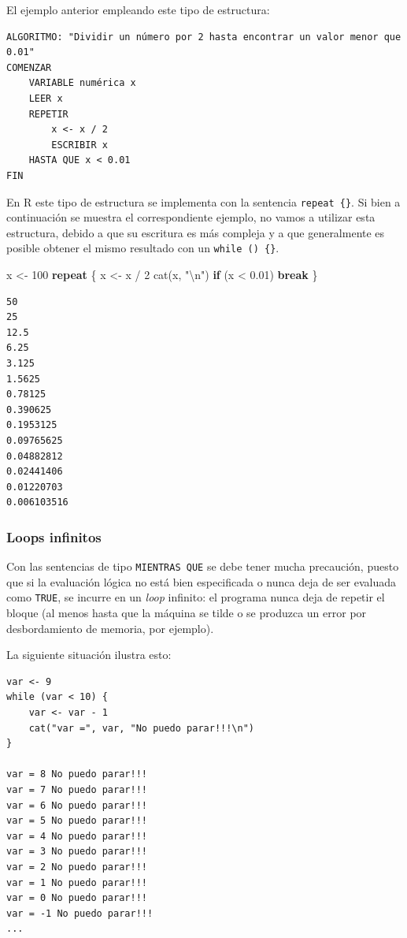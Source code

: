 \documentclass[
]{book}
\newenvironment{Shaded}{\begin{snugshade}}{\end{snugshade}}
\newcommand{\ControlFlowTok}[1]{\textcolor[rgb]{0.13,0.29,0.53}{\textbf{#1}}}
\newcommand{\DecValTok}[1]{\textcolor[rgb]{0.00,0.00,0.81}{#1}}
\newcommand{\FloatTok}[1]{\textcolor[rgb]{0.00,0.00,0.81}{#1}}
\newcommand{\FunctionTok}[1]{\textcolor[rgb]{0.00,0.00,0.00}{#1}}
\newcommand{\NormalTok}[1]{#1}
\newcommand{\OtherTok}[1]{\textcolor[rgb]{0.56,0.35,0.01}{#1}}
\newcommand{\SpecialCharTok}[1]{\textcolor[rgb]{0.00,0.00,0.00}{#1}}
\newcommand{\StringTok}[1]{\textcolor[rgb]{0.31,0.60,0.02}{#1}}
\begin{document}
El ejemplo anterior empleando este tipo de estructura:

\begin{verbatim}
ALGORITMO: "Dividir un número por 2 hasta encontrar un valor menor que 0.01"
COMENZAR
    VARIABLE numérica x
    LEER x
    REPETIR
        x <- x / 2
        ESCRIBIR x
    HASTA QUE x < 0.01
FIN
\end{verbatim}

En R este tipo de estructura se implementa con la sentencia \texttt{repeat\ \{\}}. Si bien a continuación se muestra el correspondiente ejemplo, no vamos a utilizar esta estructura, debido a que su escritura es más compleja y a que generalmente es posible obtener el mismo resultado con un \texttt{while\ ()\ \{\}}.

\begin{Shaded}
\begin{Highlighting}[]
\NormalTok{x }\OtherTok{\textless{}{-}} \DecValTok{100}
\ControlFlowTok{repeat}\NormalTok{ \{}
\NormalTok{    x }\OtherTok{\textless{}{-}}\NormalTok{ x }\SpecialCharTok{/} \DecValTok{2}
    \FunctionTok{cat}\NormalTok{(x, }\StringTok{"}\SpecialCharTok{\textbackslash{}n}\StringTok{"}\NormalTok{)}
    \ControlFlowTok{if}\NormalTok{ (x }\SpecialCharTok{\textless{}} \FloatTok{0.01}\NormalTok{) }\ControlFlowTok{break}
\NormalTok{\}}
\end{Highlighting}
\end{Shaded}

\begin{verbatim}
50 
25 
12.5 
6.25 
3.125 
1.5625 
0.78125 
0.390625 
0.1953125 
0.09765625 
0.04882812 
0.02441406 
0.01220703 
0.006103516 
\end{verbatim}

\hypertarget{loops-infinitos}{%
\subsubsection{Loops infinitos}\label{loops-infinitos}}

Con las sentencias de tipo \texttt{MIENTRAS\ QUE} se debe tener mucha precaución, puesto que si la evaluación lógica no está bien especificada o nunca deja de ser evaluada como \texttt{TRUE}, se incurre en un \emph{loop} infinito: el programa nunca deja de repetir el bloque (al menos hasta que la máquina se tilde o se produzca un error por desbordamiento de memoria, por ejemplo).

La siguiente situación ilustra esto:

\begin{verbatim}
var <- 9
while (var < 10) {
    var <- var - 1
    cat("var =", var, "No puedo parar!!!\n")
}

var = 8 No puedo parar!!!
var = 7 No puedo parar!!!
var = 6 No puedo parar!!!
var = 5 No puedo parar!!!
var = 4 No puedo parar!!!
var = 3 No puedo parar!!!
var = 2 No puedo parar!!!
var = 1 No puedo parar!!!
var = 0 No puedo parar!!!
var = -1 No puedo parar!!!
...
\end{verbatim}
\end{document}
